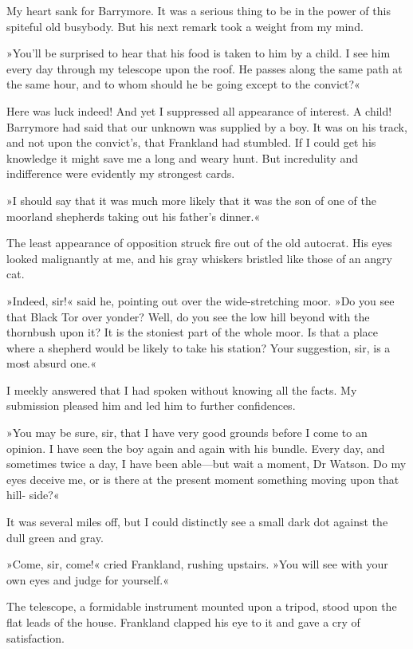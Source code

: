 My heart sank for Barrymore. It was a serious thing to be in the power of this spiteful old busybody. But his next remark took a weight from my mind.

»You'll be surprised to hear that his food is taken to him by a child. I see him every day through my telescope upon the roof. He passes along the same path at the same hour, and to whom should he be going except to the convict?«

Here was luck indeed! And yet I suppressed all appearance of interest. A child! Barrymore had said that our unknown was supplied by a boy. It was on his track, and not upon the convict's, that Frankland had stumbled. If I could get his knowledge it might save me a long and weary hunt. But incredulity and indifference were evidently my strongest cards.

»I should say that it was much more likely that it was the son of one of the moorland shepherds taking out his father's dinner.«

The least appearance of opposition struck fire out of the old autocrat. His eyes looked malignantly at me, and his gray whiskers bristled like those of an angry cat.

»Indeed, sir!« said he, pointing out over the wide-stretching moor. »Do you see that Black Tor over yonder? Well, do you see the low hill beyond with the thornbush upon it? It is the stoniest part of the whole moor. Is that a place where a shepherd would be likely to take his station? Your suggestion, sir, is a most absurd one.«

I meekly answered that I had spoken without knowing all the facts. My submission pleased him and led him to further confidences.

»You may be sure, sir, that I have very good grounds before I come to an opinion. I have seen the boy again and again with his bundle. Every day, and sometimes twice a day, I have been able\allowbreak---\allowbreak but wait a moment, Dr Watson. Do my eyes deceive me, or is there at the present moment something moving upon that hill- side?«

It was several miles off, but I could distinctly see a small dark dot against the dull green and gray.

»Come, sir, come!« cried Frankland, rushing upstairs. »You will see with your own eyes and judge for yourself.«

The telescope, a formidable instrument mounted upon a tripod, stood upon the flat leads of the house. Frankland clapped his eye to it and gave a cry of satisfaction.

